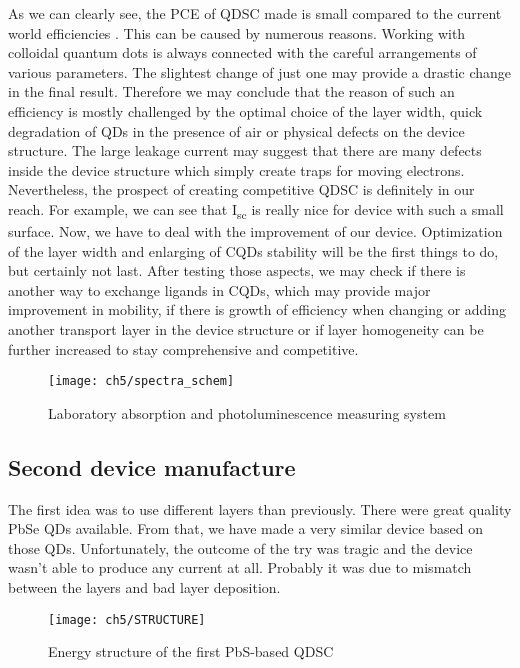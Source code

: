 As we can clearly see, the PCE of QDSC made is small compared to the
current world efficiencies \cite{Kamat2018}. This can be caused by numerous reasons.
Working with colloidal quantum dots is always connected with the careful
arrangements of various parameters. The slightest change of just one may
provide a drastic change in the final result. Therefore we may conclude
that the reason of such an efficiency is mostly challenged by the
optimal choice of the layer width, quick degradation of QDs in the
presence of air or physical defects on the device structure. The large
leakage current may suggest that there are many defects inside the
device structure which simply create traps for moving electrons.
Nevertheless, the prospect of creating competitive QDSC is definitely in
our reach. For example, we can see that I\textsubscript{sc} is really
nice for device with such a small surface. Now, we have to deal with
the improvement of our device. Optimization of the layer width and
enlarging of CQDs stability will be the first things to do, but
certainly not last. After testing those aspects, we may check if there
is another way to exchange ligands in CQDs, which may provide major
improvement in mobility, if there is growth of efficiency when changing
or adding another transport layer in the device structure or if layer
homogeneity can be further increased to stay comprehensive and
competitive.

\begin{figure}
\centering
\texttt{[image: ch5/spectra\_schem]}
\caption{Laboratory absorption and photoluminescence measuring system }
\label{fig:pomiary}
\end{figure}
\newpage

\subsection{Second device manufacture}

The first idea was to use different layers than previously. There were great quality PbSe QDs available. From that, we have made a very similar device based on those QDs. Unfortunately, the outcome of the try was tragic and the device wasn't able to produce any current at all. Probably it was due to mismatch between the layers and bad layer deposition. 

\begin{figure}[H]
\center
\texttt{[image: ch5/STRUCTURE]}
\caption{Energy structure of the first PbS-based QDSC}
\label{fig:1stEnergy}
\end{figure}

